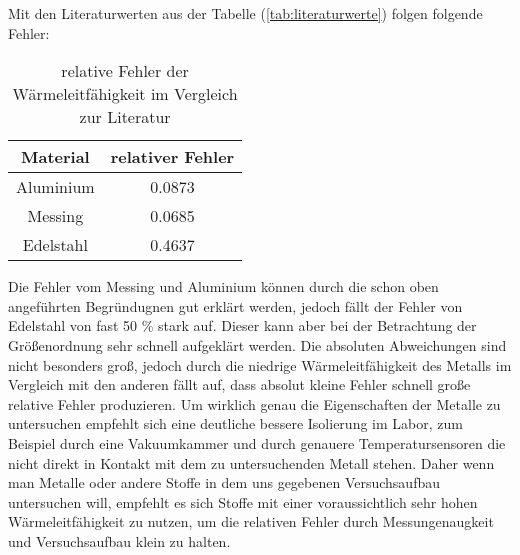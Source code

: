Mit den Literaturwerten aus der Tabelle (\ref{tab:literaturwerte}) folgen folgende Fehler:

\begin{table}
\centering
\begin{tabular}{c c}
\toprule
{Material} &{relativer Fehler}\\
\midrule
Aluminium & 0.0873 \\
Messing   & 0.0685 \\
Edelstahl & 0.4637 \\
\bottomrule
\end{tabular}
\caption{relative Fehler der Wärmeleitfähigkeit im Vergleich zur Literatur}
\label{tab:Fehler}
\end{table}

\noindent
Die Fehler vom Messing und Aluminium können durch die schon oben angeführten Begründugnen gut erklärt werden, jedoch fällt der Fehler von Edelstahl von fast 50 \% stark auf. Dieser kann aber 
bei der Betrachtung der Größenordnung sehr schnell aufgeklärt werden. Die absoluten Abweichungen sind nicht besonders groß, jedoch durch die niedrige Wärmeleitfähigkeit des Metalls im Vergleich 
mit den anderen fällt auf, dass absolut kleine Fehler schnell große relative Fehler produzieren. 
Um wirklich genau die Eigenschaften der Metalle zu untersuchen empfehlt sich eine deutliche bessere Isolierung im Labor, zum Beispiel durch eine Vakuumkammer und durch genauere Temperatursensoren
die nicht direkt in Kontakt mit dem zu untersuchenden Metall stehen.
\noindent
Daher wenn man Metalle oder andere Stoffe in dem uns gegebenen Versuchsaufbau untersuchen will, empfehlt es sich Stoffe mit einer voraussichtlich sehr hohen Wärmeleitfähigkeit zu nutzen, um die 
relativen Fehler durch Messungenaugkeit und Versuchsaufbau klein zu halten.
\newpage